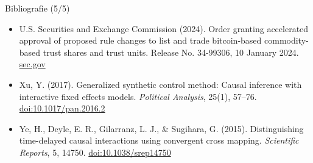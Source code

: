 \begin{frame}{Bibliografie (5/5)}
\begin{itemize}
    \item U.S. Securities and Exchange Commission (2024). Order granting accelerated approval of proposed rule changes to list and trade bitcoin-based commodity-based trust shares and trust units. Release No. 34-99306, 10 January 2024. \href{https://www.sec.gov/files/rules/sro/nysearca/2024/34-99306.pdf}{sec.gov}
    \item Xu, Y. (2017). Generalized synthetic control method: Causal inference with interactive fixed effects models. \textit{Political Analysis}, 25(1), 57--76. \href{https://doi.org/10.1017/pan.2016.2}{doi:10.1017/pan.2016.2}
    \item Ye, H., Deyle, E. R., Gilarranz, L. J., \& Sugihara, G. (2015). Distinguishing time-delayed causal interactions using convergent cross mapping. \textit{Scientific Reports}, 5, 14750. \href{https://doi.org/10.1038/srep14750}{doi:10.1038/srep14750}
\end{itemize}
\end{frame}


